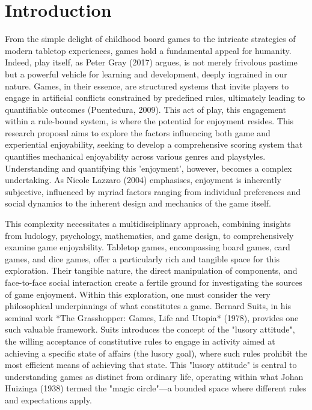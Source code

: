 \chapter{Introduction}
From the simple delight of childhood board games to the intricate strategies of modern tabletop experiences, games hold a fundamental appeal for humanity. Indeed, play itself, as Peter Gray (2017) argues, is not merely frivolous pastime but a powerful vehicle for learning and development, deeply ingrained in our nature. Games, in their essence, are structured systems that invite players to engage in artificial conflicts constrained by predefined rules, ultimately leading to quantifiable outcomes (Puentedura, 2009). This act of play, this engagement within a rule-bound system, is where the potential for enjoyment resides.  This research proposal aims to explore the factors influencing both game and experiential enjoyability, seeking to develop a comprehensive scoring system that quantifies mechanical enjoyability across various genres and playstyles.  Understanding and quantifying this 'enjoyment', however, becomes a complex undertaking.  As Nicole Lazzaro (2004) emphasises, enjoyment is inherently subjective, influenced by myriad factors ranging from individual preferences and social dynamics to the inherent design and mechanics of the game itself.

This complexity necessitates a multidisciplinary approach, combining insights from ludology, psychology, mathematics, and game design, to comprehensively examine game enjoyability. Tabletop games, encompassing board games, card games, and dice games, offer a particularly rich and tangible space for this exploration. Their tangible nature, the direct manipulation of components, and face-to-face social interaction create a fertile ground for investigating the sources of game enjoyment.  Within this exploration, one must consider the very philosophical underpinnings of what constitutes a game. Bernard Suits, in his seminal work *The Grasshopper: Games, Life and Utopia* (1978), provides one such valuable framework. Suits introduces the concept of the "lusory attitude", the willing acceptance of constitutive rules to engage in activity aimed at achieving a specific state of affairs (the lusory goal), where such rules prohibit the most efficient means of achieving that state. This "lusory attitude" is central to understanding games as distinct from ordinary life, operating within what Johan Huizinga (1938) termed the "magic circle"—a bounded space where different rules and expectations apply.


